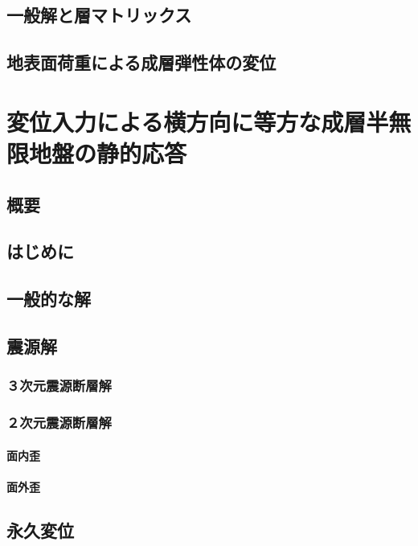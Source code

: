 \subsection{一般解と層マトリックス}

\subsection{地表面荷重による成層弾性体の変位}

\section{変位入力による横方向に等方な成層半無限地盤の静的応答}

\subsection{概要}

\subsection{はじめに}

\subsection{一般的な解}

\subsection{震源解}

\subsubsection{３次元震源断層解}

\subsubsection{２次元震源断層解}

\paragraph{面内歪}

\paragraph{面外歪}

\subsection{永久変位}

